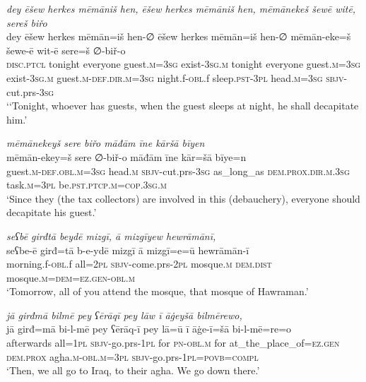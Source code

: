 \ea \label{BP.52}
\textit{dey ēšew herkes mēmāniš hen, ēšew herkes mēmāniš hen, mēmānekeš šewē witē, sereš biřo} \\ 
\gll dey ēšew herkes mēmān=iš hen-∅ ēšew herkes mēmān=iš hen-∅ mēmān-eke=š šewe-ē wit-ē sere=š ∅-biř-o \\ 
 \textsc{disc.ptcl} tonight everyone guest\textsc{.m}\textsc{=3sg} exist\textsc{-3sg}\textsc{.m} tonight everyone guest\textsc{.m}\textsc{=3sg} exist\textsc{-3sg}\textsc{.m} guest\textsc{.m}\textsc{-def}\textsc{.dir}\textsc{.m}\textsc{=3sg} night.f\textsc{-obl}.f sleep\textsc{.pst}\textsc{-3pl} head\textsc{.m}\textsc{=3sg} \textsc{sbjv-}cut.prs\textsc{-3sg} \\ 
\glt `‘Tonight, whoever has guests, when the guest sleeps at night, he shall decapitate him.'
\z 
 
\ea \label{BP.53}
\textit{mēmānekeyš sere biřo māđām īne kāršā bīyen} \\ 
\gll mēmān-ekey=š sere ∅-biř-o māđām īne kār=šā bīye=n \\ 
 guest\textsc{.m}\textsc{-def}\textsc{.obl}\textsc{.m}\textsc{=3sg} head\textsc{.m} \textsc{sbjv-}cut.prs\textsc{-3sg} as\_long\_as \textsc{dem.prox}\textsc{.dir}\textsc{.m}\textsc{.3sg} task\textsc{.m}\textsc{=3pl} be\textsc{.pst}\textsc{.ptcp}\textsc{.m}\textsc{=cop}\textsc{.3sg}\textsc{.m} \\ 
\glt `Since they (the tax collectors) are involved in this (debauchery), everyone should decapitate his guest.'
\z 
 
\ea \label{BP.54}
\textit{seʕbē girđtā beydē mizgī, ā mizgīyew hewrāmānī,} \\ 
\gll seʕbe-ē girđ=tā b-e-ydē mizgī ā mizgī=e=ū hewrāmān-ī \\ 
 morning.f\textsc{-obl}.f all=\textsc{2pl} \textsc{sbjv-}come.prs-\textsc{2pl} mosque\textsc{.m} \textsc{dem.dist} mosque\textsc{.m}\textsc{=dem}\textsc{=ez.gen}\textsc{-obl}\textsc{.m} \\ 
\glt `Tomorrow, all of you attend the mosque, that mosque of Hawraman.'
\z 
 
\ea \label{BP.56}
\textit{jā girđmā bilmē pey ʕērāqī pey lāw ī āġeyšā bilmērewo,} \\ 
\gll jā girđ=mā bi-l-mē pey ʕērāq-ī pey lā=ū ī āġe-ī=šā bi-l-mē=re=o \\ 
 afterwards all\textsc{=\textsc{1pl}} \textsc{sbjv-}go.prs\textsc{-\textsc{1pl}} for \textsc{pn}\textsc{-obl}\textsc{.m} for at\_the\_place\_of\textsc{=ez.gen} \textsc{dem.prox} agha\textsc{.m}\textsc{-obl}\textsc{.m}\textsc{=3pl} \textsc{sbjv-}go.prs\textsc{-\textsc{1pl}}\textsc{=\textsc{povb}}\textsc{=compl} \\ 
\glt `Then, we all go to Iraq, to their agha. We go down there.'
\z 
 
